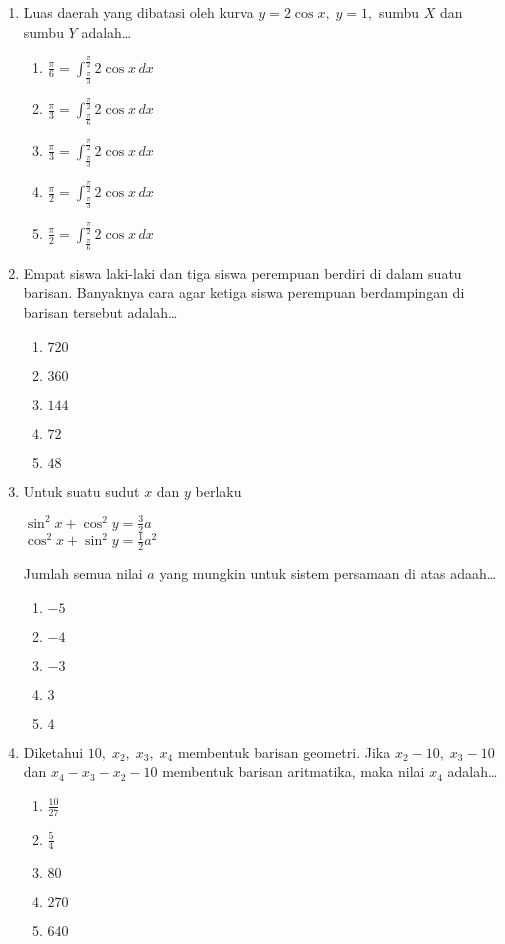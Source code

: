 \documentclass[A4,12PT, english, twocolumn]{journal}
\begin{document}
\begin{enumerate}
\item Luas daerah yang dibatasi oleh kurva $y= 2\cos{x}, \; y=1,$ sumbu $X$ dan sumbu $Y$ adalah\dots
    \begin{enumerate}
        \item $\frac{\pi}{6} = \int_{\frac{\pi}{3}}^{\frac{\pi}{2}} 2\cos{x} \, dx$
        \item $\frac{\pi}{3} = \int_{\frac{\pi}{6}}^{\frac{\pi}{2}} 2\cos{x} \, dx$
        \item $\frac{\pi}{3} = \int_{\frac{\pi}{3}}^{\frac{\pi}{2}} 2\cos{x} \, dx$
        \item $\frac{\pi}{2} = \int_{\frac{\pi}{3}}^{\frac{\pi}{2}} 2\cos{x} \, dx$
        \item $\frac{\pi}{2} = \int_{\frac{\pi}{6}}^{\frac{\pi}{2}} 2\cos{x} \, dx$
    \end{enumerate}

\item Empat siswa laki-laki dan tiga siswa perempuan berdiri di dalam suatu barisan. Banyaknya cara agar ketiga siswa perempuan berdampingan di barisan tersebut adalah\dots
    \begin{enumerate}
        \item $720$
        \item $360$
        \item $144$
        \item $72$
        \item $48$
    \end{enumerate}

\item Untuk suatu sudut $x$ dan $y$ berlaku
\begin{center}
    $\sin^2{x} + \cos^2{y} = \frac{3}{2}a$ \\
    $\cos^2{x} + \sin^2{y} = \frac{1}{2} a^2$
\end{center}
Jumlah semua nilai $a$ yang mungkin untuk sistem persamaan di atas adaah\dots
    \begin{enumerate}
        \item $-5$
        \item $-4$
        \item $-3$
        \item $3$
        \item $4$
    \end{enumerate}

\item Diketahui $10, \; x_2, \; x_3, \; x_4$ membentuk barisan geometri. Jika $x_2 - 10, \; x_3 - 10$ dan $x_4 - x_3 - x_2 - 10$ membentuk barisan aritmatika, maka nilai $x_4$ adalah\dots
    \begin{enumerate}
        \item $\frac{10}{27}$
        \item $\frac{5}{4}$
        \item $80$
        \item $270$
        \item $640$
    \end{enumerate}


\end{enumerate}
\end{document}
